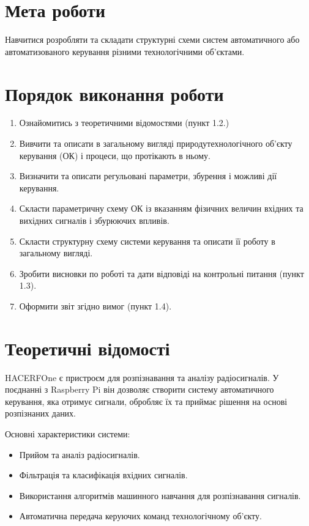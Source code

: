 \documentclass[a4paper]{article}
\begin{document}

\section*{Мета роботи}
Навчитися розробляти та складати структурні схеми
систем автоматичного або автоматизованого керування різними
технологічними об'єктами.

\section*{Порядок виконання роботи}
\begin{enumerate}
    \item Ознайомитись з теоретичними відомостями (пункт 1.2.)
    \item Вивчити та описати в загальному вигляді природутехнологічного об’єкту керування (ОК) і процеси, що протікають в ньому.
    \item Визначити та описати регульовані параметри, збурення і можливі дії керування.
    \item Скласти параметричну схему ОК із вказанням фізичних величин вхідних та вихідних сигналів і збурюючих впливів.
    \item Скласти структурну схему системи керування та описати її роботу в загальному вигляді.
    \item Зробити висновки по роботі та дати відповіді на контрольні питання (пункт 1.3).
    \item Оформити звіт згідно вимог (пункт 1.4).
\end{enumerate}

\newpage

\section*{Теоретичні відомості}
HACERFOne є пристроєм для розпізнавання та аналізу радіосигналів. У поєднанні з Raspberry Pi він дозволяє створити систему автоматичного керування, яка отримує сигнали, обробляє їх та приймає рішення на основі розпізнаних даних. 

Основні характеристики системи:
\begin{itemize}
    \item Прийом та аналіз радіосигналів.
    \item Фільтрація та класифікація вхідних сигналів.
    \item Використання алгоритмів машинного навчання для розпізнавання сигналів.
    \item Автоматична передача керуючих команд технологічному об'єкту.
\end{itemize}
\end{document}
